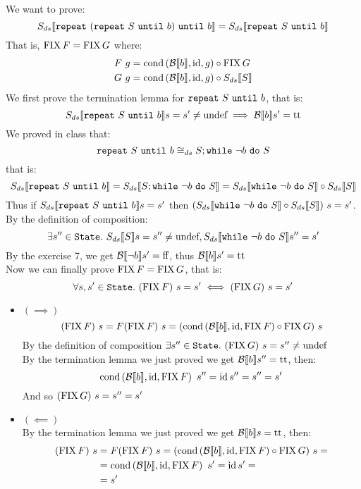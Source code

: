 \alternativeSolution
We want to prove:
\[ \Sds{\wrepeat{(\wrepeat{S}{b})}{b}} = \Sds{\wrepeat{S}{b}} \]
That is, $\FIX F = \FIX G$ where:
\begin{align*}
    F\ g &= \cond{\Bool{b}}{\id}{g} \circ \FIX G \\
    G\ g &= \cond{\Bool{b}}{\id}{g} \circ \Sds{S}
\end{align*}
We first prove the termination lemma for $\wrepeat{S}{b}$, that is:
\[ \Sds{\wrepeat{S}{b}} s = s' \neq \undef \implies \Bool{b} s' = \True \]
We proved in class that:
\[ \wrepeat{S}{b} \DScong S;\wwhile{\neg b}{S} \]
that is:
\[ \Sds{\wrepeat{S}{b}} = \Sds{S;\wwhile{\neg b}{S}} = \Sds{\wwhile{\neg b}{S}} \circ \Sds{S} \]
Thus if $\Sds{\wrepeat{S}{b}} s = s'$ then $(\Sds{\wwhile{\neg b}{S}} \circ \Sds{S})\ s = s'$. \\
By the definition of composition:
\[ \exists s'' \in \State.\ \Sds{S} s = s'' \neq \undef, \Sds{\wwhile{\neg b}{S}} s'' = s' \]
By the exercise 7, we get $\Bool{\neg b} s' = \False$, thus $\Bool{b} s' = \True$ \\
Now we can finally prove $\FIX F = \FIX G$, that is:
\[ \forall s, s' \in \State.\ (\FIX F)\ s = s' \iff (\FIX G)\ s = s' \]
\begin{itemize}
    \item $(\implies)$
        \[ (\FIX F)\ s = F(\FIX F)\ s = (\cond{\Bool{b}}{\id}{\FIX F} \circ \FIX G)\ s \]
        By the definition of composition $\exists s'' \in \State.\ (\FIX G)\ s = s'' \neq \undef$ \\
        By the termination lemma we just proved we get $\Bool{b} s'' = \True$, then:
        \[ \cond{\Bool{b}}{\id}{\FIX F}\ s'' = \id s'' = s'' = s' \]
        And so $(\FIX G)\ s = s'' = s'$
    \item $(\impliedby)$ \\
        By the termination lemma we just proved we get $\Bool{b} s = \True$, then:
        \begin{align*}
            (\FIX F)\ s &= F(\FIX F)\ s = (\cond{\Bool{b}}{\id}{\FIX F} \circ \FIX G)\ s = \\
            &= \cond{\Bool{b}}{\id}{\FIX F}\ s' = \id s' = \\
            &= s'
        \end{align*}
\end{itemize}
